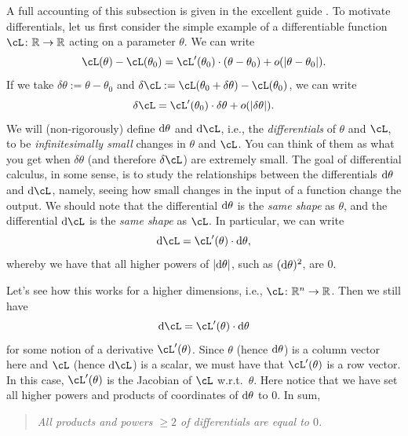 \documentclass[../../book-main.tex]{subfiles}
\begin{document}
A full accounting of this subsection is given in the excellent guide \cite{bright2025matrix}. To motivate differentials, let us first consider the simple example of a differentiable function \(\cL \colon \R \to \R\) acting on a parameter \(\theta\). We can write 
\begin{equation}
    \cL(\theta) - \cL(\theta_{0}) = \cL^{\prime}(\theta_{0})\cdot(\theta - \theta_{0}) + o(\abs{\theta - \theta_{0}}).
\end{equation}
If we take \(\delta\theta := \theta - \theta_{0}\) and \(\delta\cL := \cL(\theta_{0} + \delta\theta) - \cL(\theta_{0})\), we can write 
\begin{equation}
    \delta\cL = \cL^{\prime}(\theta_{0})\cdot\delta\theta + o(\abs{\delta\theta}).
\end{equation}
We will (non-rigorously) define \(\odif{\theta}\) and \(\odif{\cL}\), i.e., the \textit{differentials} of \(\theta\) and \(\cL\), to be \textit{infinitesimally small} changes in \(\theta\) and \(\cL\). You can think of them as what you get when \(\delta\theta\) (and therefore \(\delta \cL\)) are extremely small. The goal of differential calculus, in some sense, is to study the relationships between the differentials \(\odif{\theta}\) and \(\odif{\cL}\), namely, seeing how small changes in the input of a function change the output. We should note that the differential \(\odif{\theta}\) is the \textit{same shape} as \(\theta\), and the differential \(\odif{\cL}\) is the \textit{same shape} as \(\cL\). In particular, we can write 
\begin{equation}
    \odif{\cL} = \cL^{\prime}(\theta)\cdot\odif{\theta},
\end{equation}
whereby we have that all higher powers of \(\abs{\odif{\theta}}\), such as \((\odif{\theta})^{2}\), are \(0\).

Let's see how this works for a higher dimensions, i.e., \(\cL \colon \R^{n} \to \R\). Then we still have 
\begin{equation}
    \odif{\cL} = \cL^{\prime}(\theta)\cdot\odif{\theta}
\end{equation}
for some notion of a derivative \(\cL^{\prime}(\theta)\). Since \(\theta\) (hence \(\odif{\theta}\)) is a column vector here and \(\cL\) (hence \(\odif{\cL}\)) is a scalar, we must have that \(\cL^{\prime}(\theta)\) is a row vector. In this case, \(\cL^{\prime}(\theta)\) is the Jacobian of \(\cL\) w.r.t.~\(\theta\). Here notice that we have set all higher powers and products of coordinates of \(\odif{\theta}\)  to \(0\). In sum,
\begin{quote}
    \centering
    \textit{All products and powers \(\geq 2\) of differentials are equal to \(0\).}
\end{quote}
\end{document}

